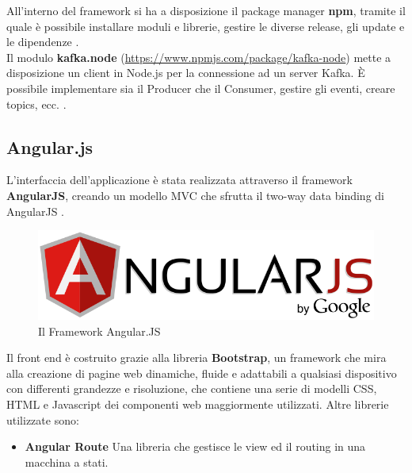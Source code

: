 \documentclass[12pt]{article}
\begin{document}
All'interno del framework si ha a disposizione il package manager \textbf{npm}, tramite il quale è possibile installare moduli e librerie, gestire le diverse release, gli update e le dipendenze \cite{nodejs}.\\

Il modulo \textbf{kafka.node} (\href{https://www.npmjs.com/package/kafka-node}{https://www.npmjs.com/package/kafka-node}) mette a disposizione un client in Node.js per la connessione ad un server Kafka. \`E possibile implementare sia il Producer che il Consumer, gestire gli eventi, creare topics, ecc. \cite{nodejs}.

\subsection{Angular.js}

L'interfaccia dell'applicazione è stata realizzata attraverso il framework \textbf{AngularJS}, creando un modello MVC che sfrutta il two-way data binding di AngularJS \cite{angularjs}.

\begin{figure}[H]
	\centering
	\includegraphics[scale=0.50]{images/angular.png}
	\caption{Il Framework Angular.JS}
	\label{angular}
\end{figure}

Il front end è costruito grazie alla libreria \textbf{Bootstrap}, un framework che mira alla creazione di pagine web dinamiche, fluide e adattabili a qualsiasi dispositivo con differenti grandezze e risoluzione, che contiene una serie di modelli CSS, HTML e Javascript dei componenti web maggiormente utilizzati. Altre librerie utilizzate sono: 
\begin{itemize}
	\item \textbf{Angular Route} Una libreria che gestisce le view ed il routing in una macchina a stati.
\end{itemize}
\end{document}
